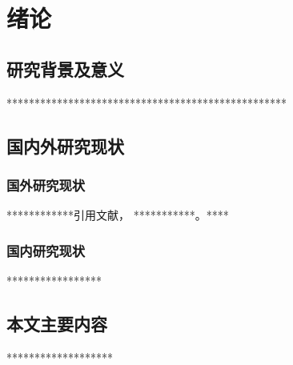 \chapter{绪论}
\section{研究背景及意义}
**************************************************
\section{国内外研究现状}
\subsection{国外研究现状}
************引用文献\cite{quigley2009ros}，
***********\cite{piastou2025efficiency}。****
\subsection{国内研究现状}
*****************
\section{本文主要内容}
*******************
